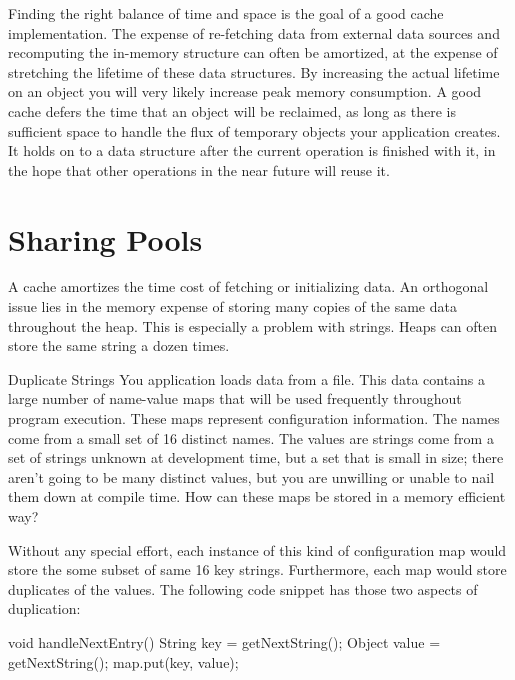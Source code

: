 Finding the right balance of time and space is the goal of a good cache
implementation. The expense of re-fetching data from external data sources and
recomputing the in-memory structure can often be amortized, at the expense of
stretching the lifetime of these data structures. By increasing the actual
lifetime on an object you will very likely increase peak memory consumption. A
good cache defers the time that an object will be reclaimed, as long as there is
sufficient space to handle the flux of temporary objects your application
creates. It holds on to a data structure after the current operation is finished
with it, in the hope that other operations in the near future will reuse it.

\section{Sharing Pools}
\label{sec:sharing-pools}

A cache amortizes the time cost of fetching or initializing data. An orthogonal
issue lies in the memory expense of storing many copies of the same data
throughout the heap. This is especially a problem with strings. Heaps can often
store the same string a dozen times.

\begin{example}{Duplicate Strings}
You application loads data from a file. This data contains a large number of
name-value maps that will be used frequently throughout program execution.
These maps represent configuration information. The names come from a small set
of 16 distinct names. The values are strings come from
a set of strings unknown at development time, but a set that is small in size;
there aren't going to be many distinct values, but you are unwilling or unable
to nail them down at compile time. How can these maps be stored in a memory
efficient way?
\end{example}

Without any special effort, each instance of this kind of configuration map
would store the some subset of same 16 key strings. Furthermore, each map would
store duplicates of the values. The following code snippet has those two
aspects of duplication:

\begin{shortlisting}
void handleNextEntry() {
	String key = getNextString();
	Object value = getNextString();
	map.put(key, value);
}
\end{shortlisting} 

